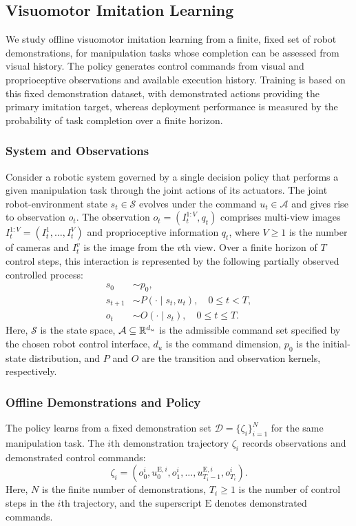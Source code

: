 \subsection{Visuomotor Imitation Learning}
\label{sec:task}

We study offline visuomotor imitation learning from a finite, fixed set of robot demonstrations,
for manipulation tasks whose completion can be assessed from visual history.
The policy generates control commands from visual and proprioceptive observations and available execution history.
Training is based on this fixed demonstration dataset, with demonstrated actions providing the primary imitation target, 
whereas deployment performance is measured by the probability of task completion over a finite horizon.

\subsubsection{System and Observations}

Consider a robotic system governed by a single decision policy that performs a given manipulation task
through the joint actions of its actuators.
The joint robot-environment state $s_t\in\mathcal S$ evolves under the command
$u_t\in\mathcal A$ and gives rise to observation $o_t$.
The observation $o_t=(I_t^{1:V},q_t)$ comprises multi-view images
$I_t^{1:V}=(I_t^1,\ldots,I_t^V)$ and proprioceptive information $q_t$,
where $V\ge1$ is the number of cameras and $I_t^v$ is the image from the $v$th view.
Over a finite horizon of $T$ control steps, this interaction is represented by the following partially observed controlled process:
\begin{align}
 s_0&\sim p_0,\nonumber\\
 s_{t+1}&\sim P(\cdot\mid s_t,u_t),\quad 0\le t<T,\nonumber\\
 o_t&\sim O(\cdot\mid s_t),\quad 0\le t\le T.
 \label{eq:interactionmodel}
\end{align}
Here, $\mathcal S$ is the state space, $\mathcal A\subseteq\mathbb R^{d_u}$ is the admissible command set
specified by the chosen robot control interface,
$d_u$ is the command dimension, $p_0$ is the initial-state distribution,
and $P$ and $O$ are the transition and observation kernels, respectively.

\subsubsection{Offline Demonstrations and Policy}
The policy learns from a fixed demonstration set $\mathcal D=\{\zeta_i\}_{i=1}^{N}$
for the same manipulation task. The $i$th demonstration trajectory $\zeta_i$ records
observations and demonstrated control commands:
\begin{equation}
 \zeta_i=(o_0^i,u_0^{\mathrm E,i},o_1^i,\ldots,
 u_{T_i-1}^{\mathrm E,i},o_{T_i}^i).
 \label{eq:demonstrations}
\end{equation}
Here, $N$ is the finite number of demonstrations, $T_i\ge1$ is the number of control steps
in the $i$th trajectory, and the superscript $\mathrm E$ denotes demonstrated commands.


